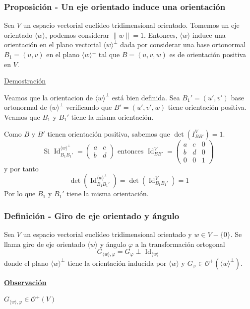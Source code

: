 \documentclass[12pt, a4paper, ones, notitlepage, openany,titlepage]{article}
\newcommand{\demostracion}{\noindent\underline{Demostración}}
\newcommand{\observacion}{\noindent\underline{\textbf{Observación}}}
\begin{document}
\subsubsection{Proposición - Un eje orientado induce una orientación}
Sea $V$ un espacio vectorial euclídeo tridimensional orientado. Tomemos un eje orientado $\langle w \rangle$, podemos considerar $\|w\| = 1$. Entonces, $\langle w \rangle$ induce una orientación en el plano vectorial $\langle w \rangle^\perp$ dada por considerar una base ortonormal $B_1 = (u,v)$ en el plano $\langle w \rangle^\perp$ tal que $B = (u,v,w)$ es de orientación positiva en $V$.

\demostracion

Veamos que la orientacion de $\langle w \rangle^\perp$ está bien definida. Sea $B_1' = (u',v')$ base ortonormal de $\langle w \rangle^\perp$ verificando que $B' = (u',v',w)$ tiene orientación positiva. Veamos que $B_1$ y $B_1'$ tiene la misma orientación.

Como $B$ y $B'$ tienen orientación positiva, sabemos que $\det(I_{BB'}^V) = 1$.
$$
\text{Si }\operatorname{Id}_{B_1 B_1'}^{\langle w \rangle^\perp} = \begin{pmatrix}
	a & c \\
	b & d
\end{pmatrix} \text{ entonces } \operatorname{Id}_{BB'}^V = \begin{pmatrix}
	a & c & 0 \\
	b & d & 0 \\
	0 & 0 & 1
\end{pmatrix}
$$
y por tanto
$$
\det\left(\operatorname{Id}_{B_1 B_1'}^{\langle w \rangle^\perp}\right) = \det\left(\operatorname{Id}_{B_1 B_1'}^V\right) = 1
$$ 
Por lo que $B_1$ y $B_1'$ tiene la misma orientación.

\subsubsection{Definición - Giro de eje orientado y ángulo}
Sea $V$ un espacio vectorial euclídeo tridimensional orientado y $w \in V - \{0\}$. Se llama giro de eje orientado $\langle w \rangle$ y ángulo $\varphi$ a la transformación ortogonal
$$
G_{\langle w \rangle, \varphi} = G_\varphi \perp \operatorname{Id}_{\langle w \rangle}
$$
donde el plano $\langle w \rangle^\perp$ tiene la orientación inducida por $\langle w \rangle$ y $G_\varphi \in \mathcal{O}^+ (\langle w \rangle^\perp)$.

\observacion

$G_{\langle w \rangle, \varphi} \in \mathcal{O}^+(V)$
\end{document}
